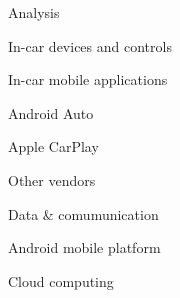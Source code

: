 \chap Analysis

\sec In-car devices and controls

\sec In-car mobile applications

\secc Android Auto

\secc Apple CarPlay

\secc Other vendors

\sec Data \& comumunication

\sec Android mobile platform

\sec Cloud computing

